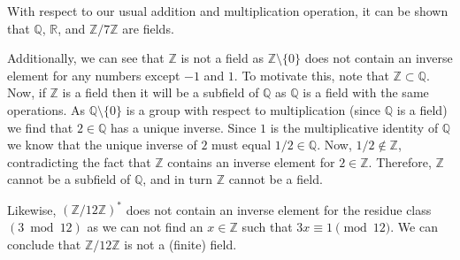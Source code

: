 \documentclass[openany, a4paper, 10pt]{book}
\theoremstyle{plain}
\theoremstyle{plain}
\theoremstyle{plain}
\theoremstyle{definition}
\theoremstyle{plain}
\theoremstyle{definition}
\theoremstyle{remark}
\begin{document}
\begin{examplebox}[label={first_example}, nameref={our previous example}]
    With respect to our usual addition and multiplication operation, it can be shown that $\mathbb Q$, $\mathbb R$, and $\mathbb Z / 7 \mathbb Z$ are fields.

    Additionally, we can see that $\mathbb Z$ is not a field as $\mathbb Z\setminus \{0\}$ does not contain an inverse element for any numbers except $-1$ and $1$.
    To motivate this, note that $\mathbb Z \subset \mathbb Q$.
    Now, if $\mathbb Z$ is a field then it will be a subfield of $\mathbb Q$ as $\mathbb Q$ is a field with the same operations.
    As $\mathbb Q \setminus \{ 0 \}$ is a group with respect to multiplication (since $\mathbb Q$ is a field) we find that $2 \in \mathbb Q$ has a unique inverse.
    Since $1$ is the multiplicative identity of $\mathbb Q$ we know that the unique inverse of $2$ must equal $1/2 \in \mathbb Q$.
    Now, $1/2 \notin \mathbb Z$, contradicting the fact that $\mathbb Z$ contains an inverse element for $2 \in \mathbb Z$.
    Therefore, $\mathbb Z$ cannot be a subfield of $\mathbb Q$, and in turn $\mathbb Z$ cannot be a field.

    Likewise, $(\mathbb Z / 12 \mathbb Z)^*$ does not contain an inverse element for the residue class $(3 \bmod 12)$ as we can not find an $x\in \mathbb Z$ such that $3x \equiv 1 \pmod {12}$.
    We can conclude that $\mathbb Z / 12 \mathbb Z$ is not a (finite) field.


\end{examplebox}
\end{document}
